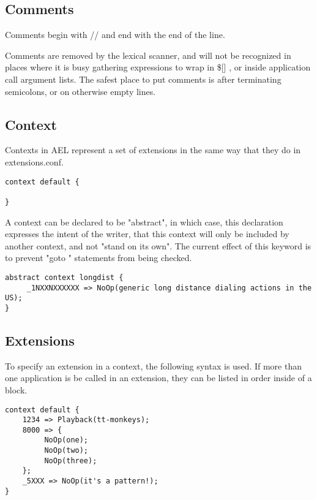 {\subsection{Comments}

Comments begin with // and end with the end of the line.

Comments are removed by the lexical scanner, and will not be
recognized in places where it is busy gathering expressions to wrap in
\$[] , or inside application call argument lists. The safest place to put
comments is after terminating semicolons, or on otherwise empty lines.


\subsection{Context}

Contexts in AEL represent a set of extensions in the same way that
they do in extensions.conf.
\begin{astlisting}
\begin{verbatim}
context default {

}
\end{verbatim}
\end{astlisting}

A context can be declared to be "abstract", in which case, this
declaration expresses the intent of the writer, that this context will
only be included by another context, and not "stand on its own". The
current effect of this keyword is to prevent "goto " statements from
being checked.
\begin{astlisting}
\begin{verbatim}
abstract context longdist {
     _1NXXNXXXXXX => NoOp(generic long distance dialing actions in the US);
}
\end{verbatim}
\end{astlisting}

\subsection{Extensions}

To specify an extension in a context, the following syntax is used. If
more than one application is be called in an extension, they can be
listed in order inside of a block.
\begin{astlisting}
\begin{verbatim}
context default {
    1234 => Playback(tt-monkeys);
    8000 => {
         NoOp(one);
         NoOp(two);
         NoOp(three);
    };
    _5XXX => NoOp(it's a pattern!);
}
\end{verbatim}
\end{astlisting}

}
